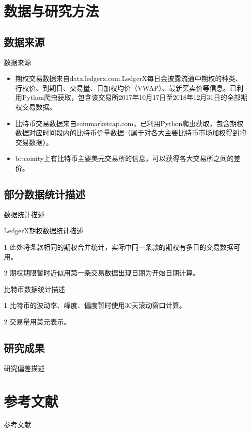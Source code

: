 \documentclass[11pt,dark]{mathbeamer}
\begin{document}
\section{数据与研究方法}
\subsection{数据来源}
\begin{frame}{数据来源}
  \begin{itemize}
    \item 期权交易数据来自data.ledgerx.com.LedgerX每日会披露流通中期权的种类、行权价、到期日、交易量、日加权均价（VWAP）、最新买卖价等信息。已利用Python爬虫获取，包含该交易所2017年10月17日至2018年12月31日的全部期权交易数据。
    \item 比特币交易数据来自coinmarketcap.com，已利用Python爬虫获取，包含期权数据对应时间段内的比特币价量数据（属于对各大主要比特币市场加权得到的交易数据）。
    \item bitcoinity上有比特币主要美元交易所的信息，可以获得各大交易所之间的差价。
  \end{itemize}
\end{frame}
\subsection{部分数据统计描述}
\begin{frame}[allowframebreaks]{数据统计描述}
  \begin{threeparttable}
    \caption{LedgerX期权数据统计描述}
    
  \begin{tablenotes}
    \tiny
    \item[1] 此处将条款相同的期权合并统计，实际中同一条款的期权有多日的交易数据可用。
    \item[2] 期权期限暂时近似用第一条交易数据出现日期为开始日期计算。
  \end{tablenotes}
  \end{threeparttable}
  
  \begin{threeparttable}
    \caption{比特币数据统计描述}
    
  \begin{tablenotes}
    \tiny
    \item[1] 比特币的波动率、峰度、偏度暂时使用30天滚动窗口计算。
    \item[2] 交易量用美元表示。
  \end{tablenotes}
  \end{threeparttable}

\end{frame}

\subsection{研究成果}
\begin{frame}{研究偏差描述}
  
\end{frame}

\section*{参考文献}
    \begin{frame}{参考文献}
        
		
	\end{frame}
\end{document}
